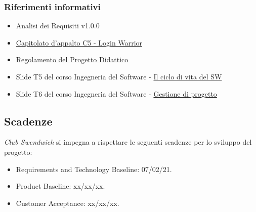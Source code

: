 \subsubsection{Riferimenti informativi}
\begin{itemize}
    \item Analisi dei Requisiti v1.0.0
    \item \href{https://www.math.unipd.it/~tullio/IS-1/2021/Progetto/C5.pdf}{Capitolato d'appalto C5 - Login Warrior}
    \item \href{https://www.math.unipd.it/~tullio/IS-1/2021/Dispense/PD2.pdf}{Regolamento del Progetto Didattico}
    \item Slide T5 del corso Ingegneria del Software - \href{https://www.math.unipd.it/~tullio/IS-1/2021/Dispense/T05.pdf}{Il ciclo di vita del SW}
    \item Slide T6 del corso Ingegneria del Software - \href{https://www.math.unipd.it/~tullio/IS-1/2021/Dispense/T06.pdf}{Gestione di progetto}
\end{itemize}

\subsection{Scadenze}
\textit{Club Swendwich} si impegna a rispettare le seguenti scadenze per lo sviluppo del progetto:
\begin{itemize}
    \item Requirements and Technology Baseline: 07/02/21.
    \item Product Baseline: xx/xx/xx.
    \item Customer Acceptance: xx/xx/xx.
\end{itemize}